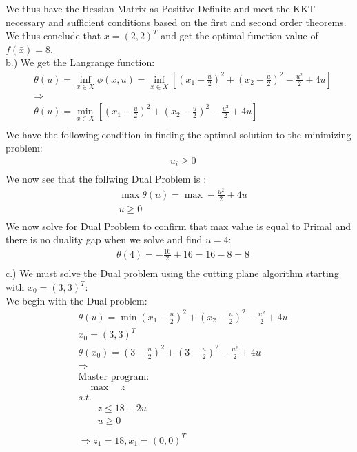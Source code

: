 \documentclass[12pt]{article}
\begin{document}
    We thus have the Hessian Matrix as Positive Definite and meet the KKT necessary and sufficient conditions based on the first and second order theorems. We thus conclude that $\bar x = (2,2)^T $ and get the optimal function value of $f(\bar x) = 8$. \\
    b.) We get the Langrange function: 
    \begin{align*}
        & \theta (u) = \inf_{x \in X} \phi (x,u) = \inf_{x \in X} [(x_1 - \frac{u}{2})^2 + (x_2 - \frac{u}{2})^2 - \frac{u^2}{2} + 4u]\\
        &\Rightarrow\\
        &\theta (u) = \min_{x \in X} [(x_1 - \frac{u}{2})^2 + (x_2 - \frac{u}{2})^2 - \frac{u^2}{2} + 4u]\\
    \end{align*}
    We have the following condition in finding the optimal solution to the minimizing problem:\\
        \begin{align*}
            &u_i \geq 0\\
        \end{align*}
    We now see that the follwing Dual Problem is : \\
        \begin{align*}
            & \max \theta (u) = \max - \frac{u^2}{2} + 4u\\
            &u \geq 0\\
        \end{align*}
    We now solve for Dual Problem to confirm that max value is equal to Primal and there is no duality gap when we solve and find $u = 4$: \\ 
        \begin{align*}
            &\theta(4) = -\frac{16}{2} + 16 = 16 - 8 = 8 \\
        \end{align*}
    c.) We must solve the Dual problem using the cutting plane algorithm starting with $x_0 = (3,3)^T:$\\
    We begin with the Dual problem: 
        \begin{align*}
            &\theta(u) = \min (x_1 - \frac{u}{2})^2 + (x_2 - \frac{u}{2})^2 - \frac{u^2}{2} + 4u \\ 
            &x_0 = (3,3)^T\\
            &\theta(x_0) = (3 - \frac{u}{2})^2 + (3 - \frac{u}{2})^2 - \frac{u^2}{2} + 4u \\ 
            &\Rightarrow\\
            &\text{Master program:}\\
            &\quad \max \quad z \\ 
            &s.t.\\
            &\quad \quad z \leq 18-2u\\
            &\quad \quad u \geq 0\\\\
            &\Rightarrow z_1 = 18 , x_1 = (0,0)^T 
        \end{align*}
\end{document}

